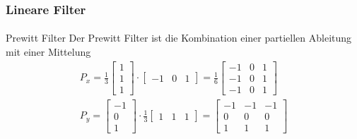 \documentclass{beamer}
\begin{document}
\begin{frame}
    \frametitle{Lineare Filter}
\framesubtitle{}

\begin{block}{Prewitt Filter}
Der Prewitt Filter ist die Kombination einer partiellen Ableitung mit einer Mittelung
\begin{align*}
P_x  = \frac{1}{3}\begin{bmatrix}  1 \\ 1 \\ 1\end{bmatrix} \cdot  \begin{bmatrix}  -1 & 0 & 1\end{bmatrix} =  \frac{1}{6} \begin{bmatrix}  -1 & 0 & 1 \\ -1 & 0 & 1 \\ -1 & 0 & 1 \end{bmatrix} \\
P_y  = \begin{bmatrix}  -1 \\ 0 \\ 1\end{bmatrix} \cdot   \frac{1}{3} \begin{bmatrix}  1 & 1 & 1\end{bmatrix} = \begin{bmatrix}  -1 & -1 & -1 \\ 0 & 0 & 0 \\ 1 & 1 & 1 \end{bmatrix} 
\end{align*}

\end{block}
 \end{frame}
\end{document}
